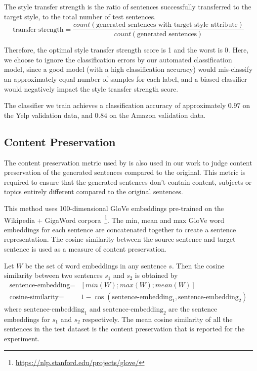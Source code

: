 The style transfer strength is the ratio of sentences successfully transferred to the target style, to the total number of test sentences.
\begin{equation*}
	\text{transfer-strength} = \frac{count(\text{generated sentences with target style attribute})}{count(\text{generated sentences})}
\end{equation*}

Therefore, the optimal style transfer strength score is 1 and the worst is 0. Here, we choose to ignore the classification errors by our automated classification model, since a good model (with a high classification accuracy) would mis-classify an approximately equal number of samples for each label, and a biased classifier would negatively impact the style transfer strength score.

The classifier we train achieves a classification accuracy of approximately $0.97$ on the Yelp validation data, and $0.84$ on the Amazon validation data.

\subsection{Content Preservation} \label{ssec:content-preservation-metric}

The content preservation metric used by \cite{fu2017style} is also used in our work to judge content preservation of the generated sentences compared to the original. This metric is required to ensure that the generated sentences don't contain content, subjects or topics entirely different compared to the original sentences.

This method uses 100-dimensional GloVe embeddings \citep{pennington2014glove} pre-trained on the Wikipedia + GigaWord corpora~\footnote{\url{https://nlp.stanford.edu/projects/glove/}}. The min, mean and max GloVe word embeddings for each sentence are concatenated together to create a sentence representation. The cosine similarity between the source sentence and target sentence is used as a measure of content preservation.

Let $W$ be the set of word embeddings in any sentence $s$. Then the cosine similarity between two sentences $s_1$ and $s_2$ is obtained by
\begin{align*}
	\text{sentence-embedding} =
	 & [min(W);max(W);mean(W)]                                            \\
	\text{cosine-similarity} =
	 & 1 - \cos(\text{sentence-embedding}_1, \text{sentence-embedding}_2)
\end{align*}
where $\text{sentence-embedding}_1$ and $\text{sentence-embedding}_2$ are the sentence embeddings for $s_1$ and $s_2$ respectively. The mean cosine similarity of all the sentences in the test dataset is the content preservation that is reported for the experiment.

